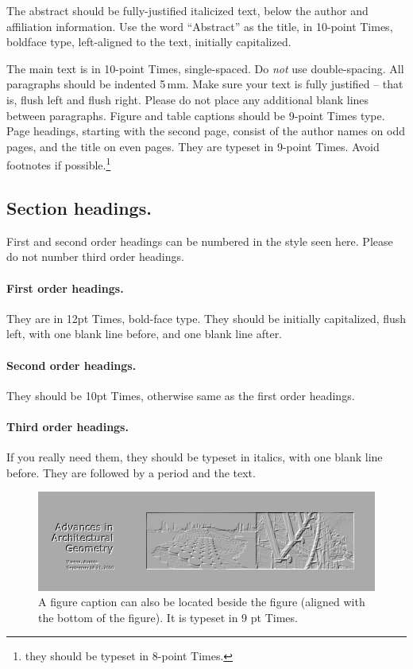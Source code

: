 \documentclass[twoside]{article}
\begin{document}
The abstract should be fully-justified italicized text, below the author 
and affiliation information. Use the word ``Abstract'' as the title, in 
10-point Times, boldface type, left-aligned to the text, initially 
capitalized.

The main text is in 10-point Times, single-spaced. Do \emph{not} use 
double-spacing. All paragraphs should be indented 5\,mm. Make sure your 
text is fully justified -- that is, flush left and flush right. Please do 
not place any additional blank lines between paragraphs. Figure and table 
captions should be 9-point Times type. Page headings, starting with the 
second page, consist of the author names on odd pages, and the title on 
even pages. They are typeset in 9-point Times.  Avoid footnotes if 
possible.\footnote{they should be typeset in 8-point Times.}


\subsection{Section headings.} First and second order headings can be 
numbered in the style seen here. Please do not number third order 
headings.

\paragraph{First order headings.}

They are in 12pt Times, bold-face type. They should be initially 
capitalized, flush left, with one blank line before, and one blank line 
after.

\paragraph{Second order headings.}

They should be 10pt Times, otherwise same as the first order headings.

\paragraph{Third order headings.}

If you really need them, they should be typeset in italics, with one blank 
line before. They are followed by a period and the text.


\begin{figure}[b]
	\includegraphics[width=.5\textwidth]{images/image1}
	\hfill
	\begin{minipage}[b]{.45\textwidth}
\caption{A figure caption can also be located beside the figure
(aligned with the bottom of the figure). It is typeset in 9 pt Times.}
	\end{minipage}
\end{figure}
\end{document}
